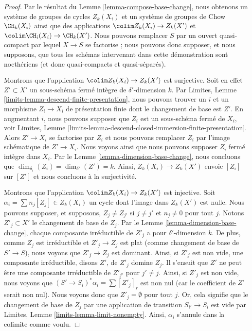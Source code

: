 \begin{proof}
Par le résultat du Lemme \ref{lemma-compose-base-change}, nous obtenons
un système de groupes de cycles $Z_k(X_i)$ et un système de
groupes de Chow $\CH_k(X_i)$ ainsi que des applications
$\colim Z_k(X_i) \to Z_k(X')$ et $\colim \CH_i(X_i) \to \CH_k(X')$.
Nous pouvons remplacer $S$ par un ouvert quasi-compact par lequel $X \to S$
se factorise ; nous pouvons donc supposer, et nous supposons, que tous les schémas intervenant dans
cette démonstration sont noethériens (et donc quasi-compacts et quasi-séparés).

\medskip\noindent
Montrons que l'application $\colim Z_k(X_i) \to Z_k(X')$ est surjective.
Soit en effet $Z' \subset X'$
un sous-schéma fermé intègre de $\delta'$-dimension $k$. Par
Limites, Lemme \ref{limits-lemma-descend-finite-presentation},
nous pouvons trouver un $i$ et un morphisme $Z_i \to X_i$ de présentation finie
dont le changement de base est $Z'$. En augmentant $i$, nous pouvons supposer que $Z_i$
est un sous-schéma fermé de $X_i$, voir
Limites, Lemme \ref{limits-lemma-descend-closed-immersion-finite-presentation}.
Alors $Z' \to X_i$ se factorise par $Z_i$ et nous pouvons remplacer $Z_i$
par l'image schématique de $Z' \to X_i$. Nous voyons ainsi
que nous pouvons supposer $Z_i$ fermé intègre dans $X_i$.
Par le Lemme \ref{lemma-dimension-base-change}, nous concluons que
$\dim_{\delta_i}(Z_i) = \dim_{\delta'}(Z') = k$.
Ainsi, $Z_k(X_i) \to Z_k(X')$ envoie $[Z_i]$ sur $[Z']$ et
nous concluons à la surjectivité.

\medskip\noindent
Montrons que l'application $\colim Z_k(X_i) \to Z_k(X')$ est injective.
Soit $\alpha_i = \sum n_j[Z_j] \in Z_k(X_i)$ un cycle dont l'image
dans $Z_k(X')$ est nulle. Nous pouvons supposer, et supposons, $Z_j \not = Z_{j'}$ si
$j \not = j'$ et $n_j \not = 0$ pour tout $j$.
Notons $Z'_j \subset X'$ le changement de base de $Z_j$.
Par le Lemme \ref{lemma-dimension-base-change}, chaque composante irréductible
de $Z'_j$ a pour $\delta'$-dimension $k$. De plus, comme $Z_j$ est irréductible
et $Z'_j \to Z_j$ est plat (comme changement de base de $S' \to S$),
nous voyons que $Z'_j \to Z_j$ est dominant.
Ainsi, si $Z'_j$ est non vide, une composante irréductible, disons
$Z'$, de $Z'_j$ domine $Z_j$. Il s'ensuit que $Z'$
ne peut être une composante irréductible de $Z'_{j'}$ pour $j' \not = j$.
Ainsi, si $Z'_j$ est non vide, nous voyons que $(S' \to S_i)^*\alpha_i
= \sum [Z'_j]_r$ est non nul (car le coefficient de $Z'$ serait non nul).
Nous voyons donc que $Z'_j = \emptyset$ pour tout $j$. Or, cela signifie
que le changement de base de $Z_j$ par une application de transition $S_{i'} \to S_i$
est vide par Limites, Lemme \ref{limits-lemma-limit-nonempty}.
Ainsi, $\alpha_i$ s'annule dans la colimite comme voulu.


\end{proof}
